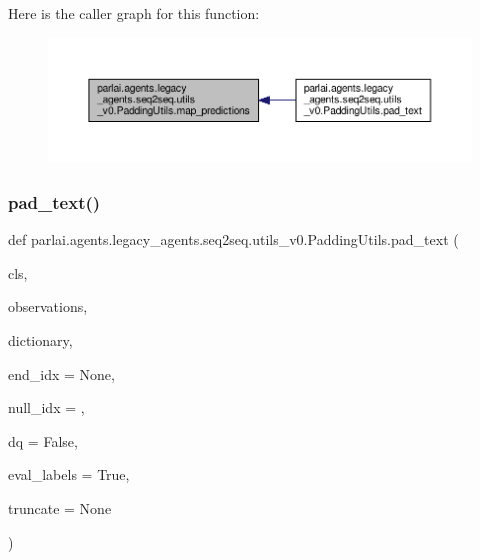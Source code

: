 Here is the caller graph for this function\+:
\nopagebreak
\begin{figure}[H]
\begin{center}
\leavevmode
\includegraphics[width=350pt]{classparlai_1_1agents_1_1legacy__agents_1_1seq2seq_1_1utils__v0_1_1PaddingUtils_ae2c46f2f424e4301873e1c5bc201646c_icgraph}
\end{center}
\end{figure}
\mbox{\label{classparlai_1_1agents_1_1legacy__agents_1_1seq2seq_1_1utils__v0_1_1PaddingUtils_ae7f9ca3d9fd7dd823895a28af6cae34f}} 
\subsubsection{\texorpdfstring{pad\+\_\+text()}{pad\_text()}}
{\footnotesize\ttfamily def parlai.\+agents.\+legacy\+\_\+agents.\+seq2seq.\+utils\+\_\+v0.\+Padding\+Utils.\+pad\+\_\+text (\begin{DoxyParamCaption}\item[{}]{cls,  }\item[{}]{observations,  }\item[{}]{dictionary,  }\item[{}]{end\+\_\+idx = {\ttfamily None},  }\item[{}]{null\+\_\+idx = {},  }\item[{}]{dq = {\ttfamily False},  }\item[{}]{eval\+\_\+labels = {\ttfamily True},  }\item[{}]{truncate = {\ttfamily None} }\end{DoxyParamCaption})}

